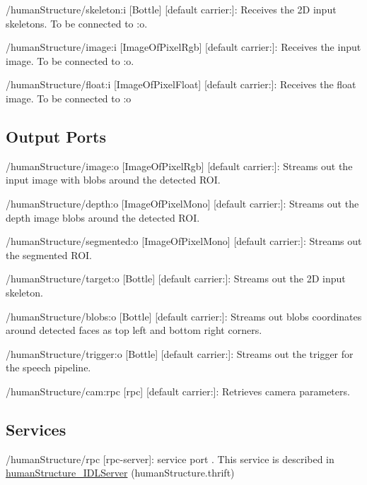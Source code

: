 \begin{DoxyItemize}
\item /human\+Structure/skeleton\+:i \mbox{[}Bottle\mbox{]} \mbox{[}default carrier\+:\mbox{]}\+: Receives the 2D input skeletons. To be connected to \+:o.
\item /human\+Structure/image\+:i \mbox{[}Image\+Of\+Pixel\+Rgb\mbox{]} \mbox{[}default carrier\+:\mbox{]}\+: Receives the input image. To be connected to \+:o.
\item /human\+Structure/float\+:i \mbox{[}Image\+Of\+Pixel\+Float\mbox{]} \mbox{[}default carrier\+:\mbox{]}\+: Receives the float image. To be connected to \+:o
\end{DoxyItemize}\hypertarget{group__skeletonViewer_outputports_sec}{}\subsection{Output Ports}\label{group__skeletonViewer_outputports_sec}

\begin{DoxyItemize}
\item /human\+Structure/image\+:o \mbox{[}Image\+Of\+Pixel\+Rgb\mbox{]} \mbox{[}default carrier\+:\mbox{]}\+: Streams out the input image with blobs around the detected R\+OI.
\item /human\+Structure/depth\+:o \mbox{[}Image\+Of\+Pixel\+Mono\mbox{]} \mbox{[}default carrier\+:\mbox{]}\+: Streams out the depth image blobs around the detected R\+OI.
\item /human\+Structure/segmented\+:o \mbox{[}Image\+Of\+Pixel\+Mono\mbox{]} \mbox{[}default carrier\+:\mbox{]}\+: Streams out the segmented R\+OI.
\item /human\+Structure/target\+:o \mbox{[}Bottle\mbox{]} \mbox{[}default carrier\+:\mbox{]}\+: Streams out the 2D input skeleton.
\item /human\+Structure/blobs\+:o \mbox{[}Bottle\mbox{]} \mbox{[}default carrier\+:\mbox{]}\+: Streams out blobs\textquotesingle{} coordinates around detected faces as top left and bottom right corners.
\item /human\+Structure/trigger\+:o \mbox{[}Bottle\mbox{]} \mbox{[}default carrier\+:\mbox{]}\+: Streams out the trigger for the speech pipeline.
\item /human\+Structure/cam\+:rpc \mbox{[}rpc\mbox{]} \mbox{[}default carrier\+:\mbox{]}\+: Retrieves camera parameters.
\end{DoxyItemize}\hypertarget{group__skeletonViewer_services_sec}{}\subsection{Services}\label{group__skeletonViewer_services_sec}

\begin{DoxyItemize}
\item /human\+Structure/rpc \mbox{[}rpc-\/server\mbox{]}\+: service port . This service is described in \hyperlink{classhumanStructure__IDLServer}{human\+Structure\+\_\+\+I\+D\+L\+Server} (human\+Structure.\+thrift) 
\end{DoxyItemize}